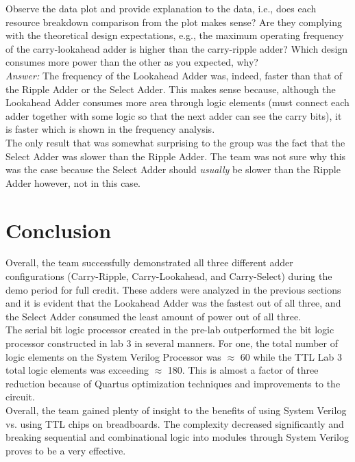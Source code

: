 \documentclass[journal, twocolumn, final,11pt,letterpaper]{IEEEtran}
\begin{document}
Observe the data plot and provide explanation to the data, i.e., does each resource
breakdown comparison from the plot makes sense? Are they complying with the theoretical
design expectations, e.g., the maximum operating frequency of the carry-lookahead adder is
higher than the carry-ripple adder? Which design consumes more power than the other as you
expected, why?\\

\textit{Answer:} The frequency of the Lookahead Adder was, indeed, faster than that of the Ripple Adder or the Select Adder. This makes sense because, although the Lookahead Adder consumes more area through logic elements (must connect each adder together with some logic so that the next adder can see the carry bits), it is faster which is shown in the frequency analysis.\\

The only result that was somewhat surprising to the group was the fact that the Select Adder was slower than the Ripple Adder. The team was not sure why this was the case because the Select Adder should \textit{usually} be slower than the Ripple Adder however, not in this case.

\section{Conclusion}
Overall, the team successfully demonstrated all three different adder configurations (Carry-Ripple, Carry-Lookahead, and Carry-Select) during the demo period for full credit. These adders were analyzed in the previous sections and it is evident that the Lookahead Adder was the fastest out of all three, and the Select Adder consumed the least amount of power out of all three.\\

The serial bit logic processor created in the pre-lab outperformed the bit logic processor constructed in lab 3 in several manners. For one, the total number of logic elements on the System Verilog Processor was $\approx$ 60 while the TTL Lab 3 total logic elements was exceeding $\approx$  180. This is almost a factor of three reduction because of Quartus optimization techniques and improvements to the circuit.\\ 

Overall, the team gained plenty of insight to the benefits of using System Verilog vs. using TTL chips on breadboards. The complexity decreased significantly and breaking sequential and combinational logic into modules through System Verilog proves to be a very effective. 
\end{document}
